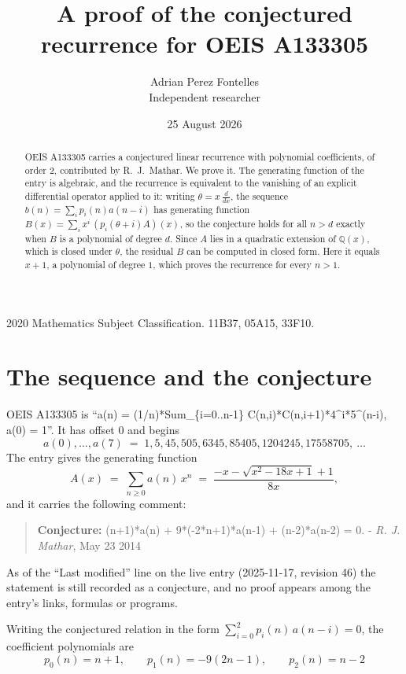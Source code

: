 \documentclass[11pt,a4paper]{article}
\title{A proof of the conjectured recurrence for OEIS A133305}
\author{Adrian Perez Fontelles\\ \small Independent researcher}
\date{25 August 2026}
\theoremstyle{plain}
\theoremstyle{definition}
\begin{document}
\maketitle

\begin{abstract}
OEIS A133305 carries a conjectured linear recurrence with polynomial coefficients, of
order 2, contributed by R.~J.~Mathar. We prove it. The generating function of the
entry is algebraic, and the recurrence is equivalent to the vanishing of an explicit
differential operator applied to it: writing $\theta=x\,\frac{d}{dx}$, the sequence
$b(n)=\sum_{i}p_{i}(n)a(n-i)$ has generating function
$B(x)=\sum_{i}x^{i}\,(p_{i}(\theta+i)A)(x)$, so the conjecture holds for all $n>d$ exactly
when $B$ is a polynomial of degree $d$. Since $A$ lies in a quadratic extension of
$\mathbb{Q}(x)$, which is closed under $\theta$, the residual $B$ can be computed in
closed form. Here it equals $x + 1$, a polynomial of degree $1$, which proves
the recurrence for every $n>1$.
\end{abstract}

\noindent\small 2020 Mathematics Subject Classification. 11B37, 05A15, 33F10.\normalsize

\section{The sequence and the conjecture}

OEIS A133305 is ``a(n) = (1/n)*Sum\_\{i=0..n-1\} C(n,i)*C(n,i+1)*4\^{}i*5\^{}(n-i), a(0) = 1''. It has offset $0$ and begins
\[
a(0),\dots,a(7)\;=\;1, 5, 45, 505, 6345, 85405, 1204245, 17558705,\ \dots
\]
The entry gives the generating function
\begin{equation}\label{eq:gf}
A(x)\;=\;\sum_{n\ge 0} a(n)\,x^{n}\;=\;\frac{- x - \sqrt{x^{2} - 18 x + 1} + 1}{8 x} ,
\end{equation}
and it carries the following comment:
\begin{quote}\small
\textbf{Conjecture:} (n+1)*a(n) + 9*(-2*n+1)*a(n-1) + (n-2)*a(n-2) = 0. - \emph{R. J. Mathar}, May 23 2014
\end{quote}
As of the ``Last modified'' line on the live entry (2025-11-17, revision 46) the
statement is still recorded as a conjecture, and no proof appears among the entry's links,
formulas or programs.

Writing the conjectured relation in the form $\sum_{i=0}^{2}p_{i}(n)\,a(n-i)=0$,
the coefficient polynomials are
\[
p_{0}(n)=n + 1,\qquad p_{1}(n)=- 9 \left(2 n - 1\right),\qquad p_{2}(n)=n - 2
\]
\end{document}
